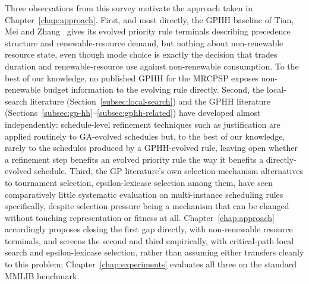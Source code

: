 Three observations from this survey motivate the approach taken in
Chapter~\ref{chap:approach}. First, and most directly, the GPHH baseline of
Tian, Mei and Zhang~\cite{Tian2024GPHH} gives its evolved priority rule
terminals describing precedence structure and renewable-resource demand,
but nothing about non-renewable resource state, even though mode choice is
exactly the decision that trades duration and renewable-resource use
against non-renewable consumption. To the best of our knowledge, no
published GPHH for the MRCPSP exposes non-renewable budget information to
the evolving rule directly. Second, the local-search literature
(Section~\ref{subsec:local-search}) and the GPHH literature
(Sections~\ref{subsec:gp-hh}--\ref{subsec:gphh-related}) have developed
almost independently: schedule-level refinement techniques such as
justification are applied routinely to GA-evolved schedules but, to the
best of our knowledge, rarely to the schedules produced by a GPHH-evolved
rule, leaving open whether a  refinement step
benefits an evolved priority rule the way it benefits a directly-evolved
schedule. Third, the
GP literature's own selection-mechanism alternatives to tournament
selection, epsilon-lexicase selection among them, have seen comparatively
little systematic evaluation on multi-instance scheduling rules
specifically, despite selection pressure being a mechanism that can be
changed without touching representation or fitness at all. Chapter~\ref{chap:approach}
accordingly proposes closing the first gap directly, with non-renewable
resource terminals, and screens the second and third empirically, with
critical-path local search and epsilon-lexicase selection, rather than
assuming either transfers cleanly to this problem; Chapter~\ref{chap:experiments}
evaluates all three on the standard MMLIB benchmark.
